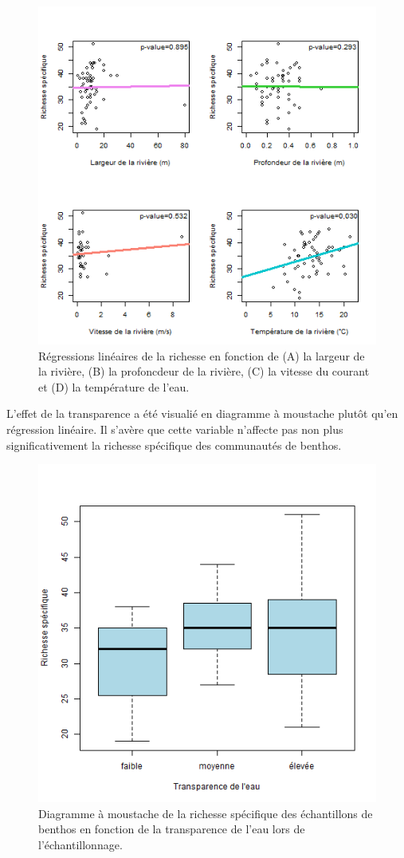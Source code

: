\documentclass[9pt,twocolumn,twoside,]{pnas-new}
\begin{document}
\begin{figure}
\centering
\includegraphics{regression_richesse.png}
\caption{Régressions linéaires de la richesse en fonction de (A) la
largeur de la rivière, (B) la profoncdeur de la rivière, (C) la vitesse
du courant et (D) la température de l'eau.
\label{fig:regression_richesse}}
\end{figure}

L'effet de la transparence a été visualié en diagramme à moustache
plutôt qu'en régression linéaire. Il s'avère que cette variable
n'affecte pas non plus significativement la richesse spécifique des
communautés de benthos.

\begin{figure}
\centering
\includegraphics{boxplot_richesse.png}
\caption{Diagramme à moustache de la richesse spécifique des
échantillons de benthos en fonction de la transparence de l'eau lors de
l'échantillonnage. \label{fig:boxplot_richesse}}
\end{figure}
\end{document}
